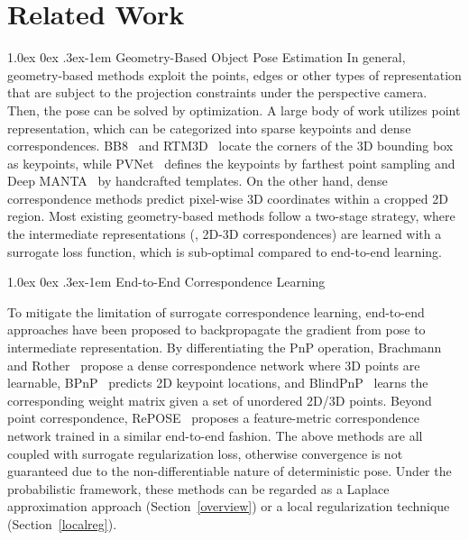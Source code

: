 \documentclass[10pt,twocolumn,letterpaper]{article}
\makeatletter
\renewcommand{\paragraph}{
  \@startsection{paragraph}{4}
  {\z@}{1.0ex \@plus 0ex \@minus .3ex}{-1em}
  {\normalfont\normalsize\bfseries}
}
\makeatother
\begin{document}
\section{Related Work}

\paragraph{Geometry-Based Object Pose Estimation}
In general, geometry-based methods exploit the points, edges or other types of representation that are subject to the projection constraints under the perspective camera. Then, the pose can be solved by optimization. A large body of work utilizes point representation, which can be categorized into sparse keypoints and dense correspondences. BB8~\cite{bb8} and RTM3D~\cite{RTM3D} locate the corners of the 3D bounding box as keypoints, while PVNet~\cite{pvnet} defines the keypoints by farthest point sampling and Deep MANTA~\cite{deep-manta} by handcrafted templates. On the other hand, dense correspondence methods \cite{pix2pose, CDPN, DPOD, monorun, NOCS} predict pixel-wise 3D coordinates within a cropped 2D region.
Most existing geometry-based methods follow a two-stage strategy, where the intermediate representations (\ie, 2D-3D correspondences) are learned with a surrogate loss function, which is sub-optimal compared to end-to-end learning.

\paragraph{End-to-End Correspondence Learning}

To mitigate the limitation of surrogate correspondence learning, end-to-end approaches have been proposed to backpropagate the gradient from pose to intermediate representation. By differentiating the PnP operation, Brachmann and Rother~\cite{dsac++} propose a dense correspondence network where 3D points are learnable, BPnP~\cite{BPnP} predicts 2D keypoint locations, and BlindPnP~\cite{blindpnp} learns the corresponding weight matrix given a set of unordered 2D/3D points. Beyond point correspondence, RePOSE~\cite{repose} proposes a feature-metric correspondence network trained in a similar end-to-end fashion. The above methods are all coupled with surrogate regularization loss, otherwise convergence is not guaranteed due to the non-differentiable nature of deterministic pose. Under the probabilistic framework, these methods can be regarded as a Laplace approximation approach (Section~\ref{overview}) or a local regularization technique (Section~\ref{localreg}).
\end{document}
